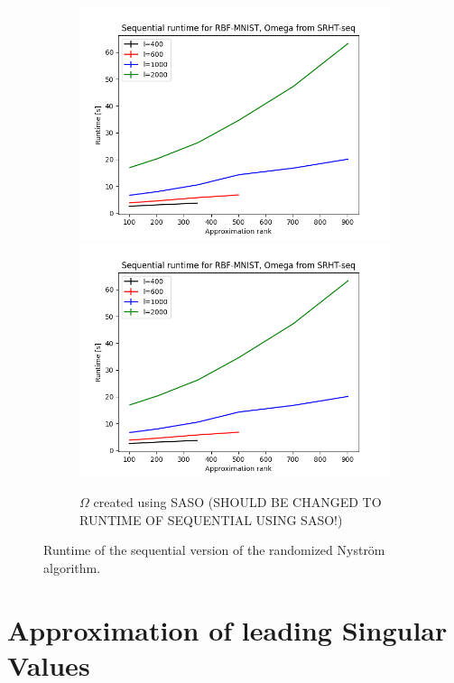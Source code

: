 \documentclass{article}
\theoremstyle{definition}
\begin{document}
\begin{figure}
\begin{subfigure}[t]{0.35\textwidth}
    \includegraphics[width=\textwidth]{plots/runtime_new/runtime_RBF-MNIST_SRHT-seq.png}
    \includegraphics[width=\textwidth]{plots/runtime_new/runtime_RBF-MNIST_SRHT-seq.png}
    \caption{$\Omega$ created using SASO (SHOULD BE CHANGED TO RUNTIME OF SEQUENTIAL USING SASO!)}
\end{subfigure}\hfill
\caption{Runtime of the sequential version of the randomized Nyström algorithm.}
\label{fig:SequentialRuntime}
\end{figure}

\section{Approximation of leading Singular Values}
\end{document}
